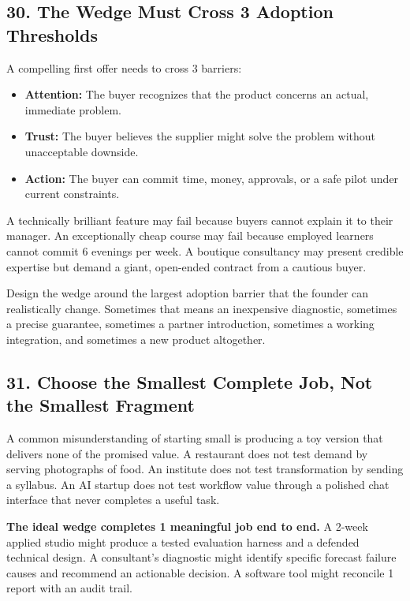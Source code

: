 \subsection*{30. The Wedge Must Cross 3 Adoption Thresholds}

A compelling first offer needs to cross 3 barriers:

\begin{itemize}
    \item \textbf{Attention:} The buyer recognizes that the product concerns an actual, immediate problem.
    \item \textbf{Trust:} The buyer believes the supplier might solve the problem without unacceptable downside.
    \item \textbf{Action:} The buyer can commit time, money, approvals, or a safe pilot under current constraints.
\end{itemize}

A technically brilliant feature may fail because buyers cannot explain it to their manager. An exceptionally cheap course may fail because employed learners cannot commit 6 evenings per week. A boutique consultancy may present credible expertise but demand a giant, open-ended contract from a cautious buyer.

Design the wedge around the largest adoption barrier that the founder can realistically change. Sometimes that means an inexpensive diagnostic, sometimes a precise guarantee, sometimes a partner introduction, sometimes a working integration, and sometimes a new product altogether.

\subsection*{31. Choose the Smallest Complete Job, Not the Smallest Fragment}

A common misunderstanding of starting small is producing a toy version that delivers none of the promised value. A restaurant does not test demand by serving photographs of food. An institute does not test transformation by sending a syllabus. An AI startup does not test workflow value through a polished chat interface that never completes a useful task.

\textbf{The ideal wedge completes 1 meaningful job end to end.} A 2-week applied studio might produce a tested evaluation harness and a defended technical design. A consultant's diagnostic might identify specific forecast failure causes and recommend an actionable decision. A software tool might reconcile 1 report with an audit trail.

